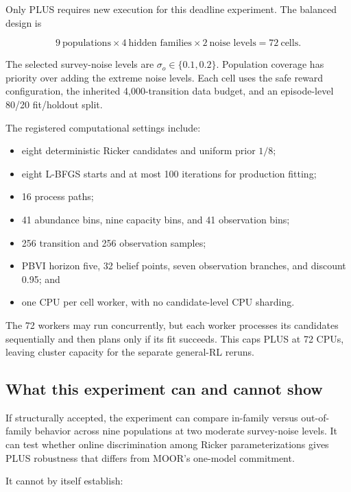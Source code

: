 \documentclass[11pt]{article}
\begin{document}
Only PLUS requires new execution for this deadline experiment. The balanced design is

\begin{equation}
9\ \text{populations}\times4\ \text{hidden families}\times
2\ \text{noise levels}=72\ \text{cells}.
\end{equation}

The selected survey-noise levels are $\sigma_o\in\{0.1,0.2\}$. Population coverage has priority
over adding the extreme noise levels. Each cell uses the safe reward configuration, the inherited
4,000-transition data budget, and an episode-level 80/20 fit/holdout split.

The registered computational settings include:

\begin{itemize}
  \item eight deterministic Ricker candidates and uniform prior $1/8$;
  \item eight L-BFGS starts and at most 100 iterations for production fitting;
  \item 16 process paths;
  \item 41 abundance bins, nine capacity bins, and 41 observation bins;
  \item 256 transition and 256 observation samples;
  \item PBVI horizon five, 32 belief points, seven observation branches, and discount 0.95; and
  \item one CPU per cell worker, with no candidate-level CPU sharding.
\end{itemize}

The 72 workers may run concurrently, but each worker processes its candidates sequentially and then
plans only if its fit succeeds. This caps PLUS at 72 CPUs, leaving cluster capacity for the separate
general-RL reruns.

\subsection{What this experiment can and cannot show}

If structurally accepted, the experiment can compare in-family versus out-of-family behavior across
nine populations at two moderate survey-noise levels. It can test whether online discrimination
among Ricker parameterizations gives PLUS robustness that differs from MOOR's one-model commitment.

It cannot by itself establish:
\end{document}
